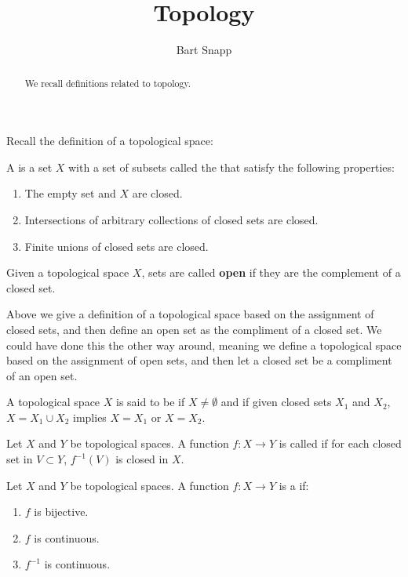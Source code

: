 \documentclass{ximera}
\author{Bart Snapp}
\title{Topology}
\begin{document}
\begin{abstract}
  We recall definitions related to topology. 
\end{abstract}
\maketitle

Recall the definition of a topological space:

\begin{definition}
  A  is a set $X$ with a set of subsets called
  the  that satisfy the following properties:
  \begin{enumerate}
  \item The empty set and $X$ are closed.
  \item Intersections of arbitrary collections of closed sets are
    closed.
  \item Finite unions of closed sets are closed.
  \end{enumerate}
\end{definition}


\begin{definition}
  Given a topological space $X$, sets are called \textbf{open} if they
  are the complement of a closed set.
\end{definition}


\begin{remark}
  Above we give a definition of a topological space based on the
  assignment of closed sets, and then define an open set as the
  compliment of a closed set. We could have done this the other way
  around, meaning we define a topological space based on the
  assignment of open sets, and then let a closed set be a compliment
  of an open set.
\end{remark}


\begin{definition}
  A topological space $X$ is said to be  if $X\ne
  \emptyset$ and if given closed sets $X_1$ and $X_2$, $X=X_1\cup X_2$
  implies $X=X_1$ or $X=X_2$.
\end{definition}




\begin{definition}
  Let $X$ and $Y$ be topological spaces. A function $f:X\to Y$ is
  called  if for each closed set in $V \subset Y$,
  $f^{-1}(V)$ is closed in $X$.
\end{definition}



\begin{definition}
  Let $X$ and $Y$ be topological spaces. A function $f:X\to Y$ is a
   if:
  \begin{enumerate}
  \item $f$ is bijective.
  \item $f$ is continuous.
  \item $f^{-1}$ is continuous.
  \end{enumerate}
\end{definition}
\end{document}
